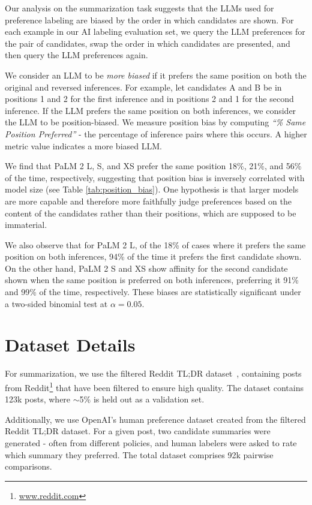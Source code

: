 \documentclass[11pt]{article}
\begin{document}
Our analysis on the summarization task suggests that the LLMs used for preference labeling are biased by the order in which candidates are shown. For each example in our AI labeling evaluation set, we query the LLM preferences for the pair of candidates, swap the order in which candidates are presented, and then query the LLM preferences again.

We consider an LLM to be \textit{more biased} if it prefers the same position on both the original and reversed inferences. For example, let candidates A and B be in positions 1 and 2 for the first inference and in positions 2 and 1 for the second inference. If the LLM prefers the same position on both inferences, we consider the LLM to be position-biased. We measure position bias by computing \textit{``\% Same Position Preferred''} - the percentage of inference pairs where this occurs. A higher metric value indicates a more biased LLM.

We find that PaLM 2 L, S, and XS prefer the same position 18\%, 21\%, and 56\% of the time, respectively, suggesting that position bias is inversely correlated with model size (see Table \ref{tab:position_bias}). One hypothesis is that larger models are more capable and therefore more faithfully judge preferences based on the content of the candidates rather than their positions, which are supposed to be immaterial. 

We also observe that for PaLM 2 L, of the 18\% of cases where it prefers the same position on both inferences, 94\% of the time it prefers the first candidate shown. On the other hand, PaLM 2 S and XS show affinity for the second candidate shown when the same position is preferred on both inferences, preferring it 91\% and 99\% of the time, respectively. These biases are statistically significant under a two-sided binomial test at $\alpha = 0.05$.



\section{Dataset Details}
\label{sec:dataset_details}

For summarization, we use the filtered Reddit TL;DR dataset~\citep{stiennon2020learning}, containing posts from Reddit\footnote{\url{www.reddit.com}} that have been filtered to ensure high quality. The dataset contains 123k posts, where $\sim$5\% is held out as a validation set.

Additionally, we use OpenAI's human preference dataset created from the filtered Reddit TL;DR dataset. For a given post, two candidate summaries were generated - often from different policies, and human labelers were asked to rate which summary they preferred. The total dataset comprises 92k pairwise comparisons.
\end{document}
